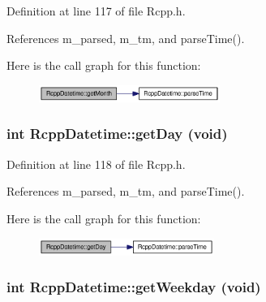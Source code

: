 Definition at line 117 of file Rcpp.h.

References m\_\-parsed, m\_\-tm, and parseTime().

Here is the call graph for this function:\nopagebreak
\begin{figure}[H]
\begin{center}
\leavevmode
\includegraphics[width=167pt]{classRcppDatetime_a7f04947d2a27e4bba2d19efa21771ed_cgraph}
\end{center}
\end{figure}
\hypertarget{classRcppDatetime_23e9f09bef162e1ffef0e43f8a446b77}{
\subsubsection[getDay]{\setlength{\rightskip}{0pt plus 5cm}int RcppDatetime::getDay (void)}}
\label{classRcppDatetime_23e9f09bef162e1ffef0e43f8a446b77}




Definition at line 118 of file Rcpp.h.

References m\_\-parsed, m\_\-tm, and parseTime().

Here is the call graph for this function:\nopagebreak
\begin{figure}[H]
\begin{center}
\leavevmode
\includegraphics[width=162pt]{classRcppDatetime_23e9f09bef162e1ffef0e43f8a446b77_cgraph}
\end{center}
\end{figure}
\hypertarget{classRcppDatetime_796802561fa8bb87a8e2a1836afaaa58}{
\subsubsection[getWeekday]{\setlength{\rightskip}{0pt plus 5cm}int RcppDatetime::getWeekday (void)}}
\label{classRcppDatetime_796802561fa8bb87a8e2a1836afaaa58}




